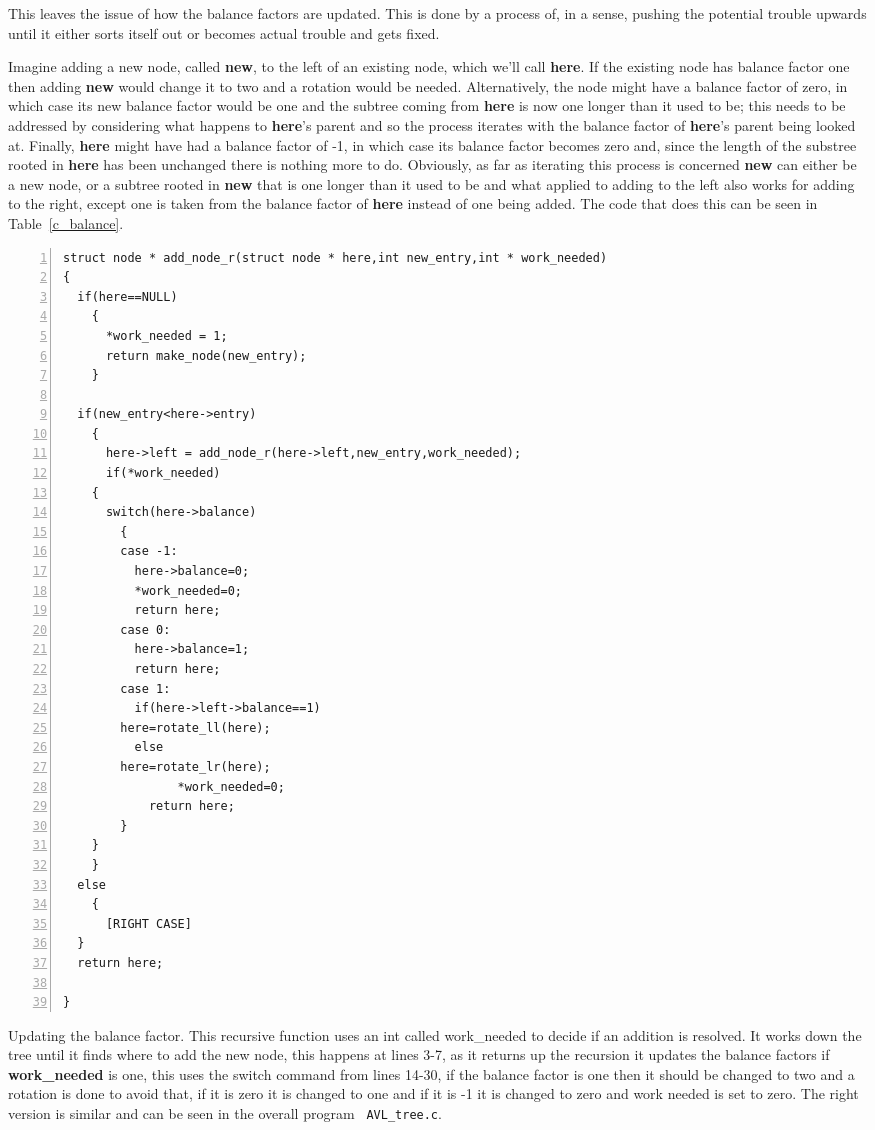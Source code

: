 \documentclass[11pt,a4paper]{scrartcl}
\begin{document}
This leaves the issue of how the balance factors are updated. This is
done by a process of, in a sense, pushing the potential trouble upwards
until it either sorts itself out or becomes actual trouble and gets
fixed.  

Imagine adding a new node, called \textbf{new}, to the left of an
existing node, which we'll call \textbf{here}. If the existing node
has balance factor one then adding \textbf{new} would change it to two
and a rotation would be needed. Alternatively, the node might have a
balance factor of zero, in which case its new balance factor would be
one and the subtree coming from \textbf{here} is now one longer than
it used to be; this needs to be addressed by considering what happens
to \textbf{here}'s parent and so the process iterates with the balance
factor of \textbf{here}'s parent being looked at. Finally,
\textbf{here} might have had a balance factor of -1, in which case its
balance factor becomes zero and, since the length of the substree
rooted in \textbf{here} has been unchanged there is nothing more to
do. Obviously, as far as iterating this process is concerned
\textbf{new} can either be a new node, or a subtree rooted in
\textbf{new} that is one longer than it used to be and what applied to
adding to the left also works for adding to the right, except one is
taken from the balance factor of \textbf{here} instead of one being
added. The code that does this can be seen in Table~\ref{c_balance}.

\begin{table}
\begin{lstlisting}[numbers=left]
struct node * add_node_r(struct node * here,int new_entry,int * work_needed)
{
  if(here==NULL)
    {
      *work_needed = 1;
      return make_node(new_entry);
    }
  
  if(new_entry<here->entry)
    {
      here->left = add_node_r(here->left,new_entry,work_needed);
      if(*work_needed)
	{
	  switch(here->balance)
	    {
	    case -1:
	      here->balance=0;
	      *work_needed=0;
	      return here;
	    case 0:
	      here->balance=1;
	      return here;
	    case 1:
	      if(here->left->balance==1)
		here=rotate_ll(here);
	      else
		here=rotate_lr(here);
       	        *work_needed=0;
	        return here;
	    }
	}
    }
  else
    {
      [RIGHT CASE]
  }
  return here;

}
\end{lstlisting}
\caption{Updating the balance factor. This recursive function uses an int called work\_needed to decide if an addition is resolved. It works down the tree until it finds where to add the new node, this happens at lines 3-7, as it returns up the recursion it updates the balance factors if \textbf{work\_needed} is one, this uses the switch command from lines 14-30, if the balance factor is one then it should be changed to two and a rotation is done to avoid that, if it is zero it is changed to one and if it is -1 it is changed to zero and work needed is set to zero. The right version is similar and can be seen in the overall program \texttt{ AVL\_tree.c}.\label{c_balance}}
\end{table}
\end{document}
